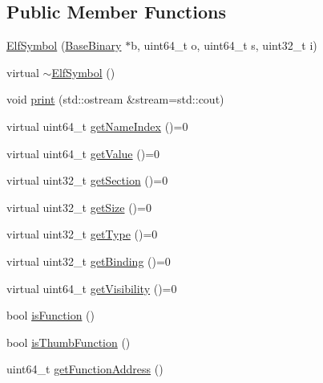 \subsection*{\-Public \-Member \-Functions}
\begin{DoxyCompactItemize}
\item 
\hyperlink{class_e_p_a_x_1_1_elf_1_1_elf_symbol_a3907cf60c70f5abf4c5c9522c7f63a74}{\-Elf\-Symbol} (\hyperlink{class_e_p_a_x_1_1_base_binary}{\-Base\-Binary} $\ast$b, uint64\-\_\-t o, uint64\-\_\-t s, uint32\-\_\-t i)
\item 
virtual \hyperlink{class_e_p_a_x_1_1_elf_1_1_elf_symbol_af409dbd1b83de98f977c7d8eea73e66f}{$\sim$\-Elf\-Symbol} ()
\item 
void \hyperlink{class_e_p_a_x_1_1_elf_1_1_elf_symbol_a19338c302c20a71a101be47205a44908}{print} (std\-::ostream \&stream=std\-::cout)
\item 
virtual uint64\-\_\-t \hyperlink{class_e_p_a_x_1_1_elf_1_1_elf_symbol_a84ccb1d566bee093da094e2c4b617ba7}{get\-Name\-Index} ()=0
\item 
virtual uint64\-\_\-t \hyperlink{class_e_p_a_x_1_1_elf_1_1_elf_symbol_a20b9df356b7d4ef1481dc8fdeaf4b2fc}{get\-Value} ()=0
\item 
virtual uint32\-\_\-t \hyperlink{class_e_p_a_x_1_1_elf_1_1_elf_symbol_a92184692a8f808802963e1a7ca9606d7}{get\-Section} ()=0
\item 
virtual uint32\-\_\-t \hyperlink{class_e_p_a_x_1_1_elf_1_1_elf_symbol_a38fb6985ad991affbb10051eac2aa75e}{get\-Size} ()=0
\item 
virtual uint32\-\_\-t \hyperlink{class_e_p_a_x_1_1_elf_1_1_elf_symbol_a540aabaf19398d8512f7bdb9255fa9d6}{get\-Type} ()=0
\item 
virtual uint32\-\_\-t \hyperlink{class_e_p_a_x_1_1_elf_1_1_elf_symbol_a3bed4c1dcd7d20cdd492c16977e59b93}{get\-Binding} ()=0
\item 
virtual uint64\-\_\-t \hyperlink{class_e_p_a_x_1_1_elf_1_1_elf_symbol_a31b56e39f50f311ab23e878faba5d5b4}{get\-Visibility} ()=0
\item 
bool \hyperlink{class_e_p_a_x_1_1_elf_1_1_elf_symbol_ad6142f5f07372bffd2f0b9a482696821}{is\-Function} ()
\item 
bool \hyperlink{class_e_p_a_x_1_1_elf_1_1_elf_symbol_a4f27b2be55f35a4c9a75b5e52bce6e23}{is\-Thumb\-Function} ()
\item 
uint64\-\_\-t \hyperlink{class_e_p_a_x_1_1_elf_1_1_elf_symbol_a81a2839b65f94ce09a1f65a70bb268e1}{get\-Function\-Address} ()
\end{DoxyCompactItemize}
